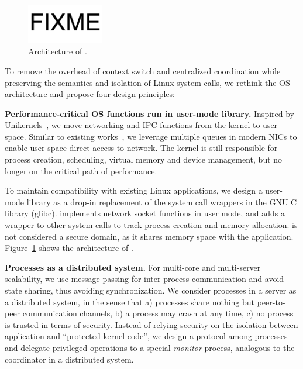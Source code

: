 \begin{figure}[t]
	\centering
	\includegraphics[width=0.3\textwidth]{images/fixme}
	\caption{Architecture of \sys{}.}
	\label{fig:architecture}
\end{figure}


To remove the overhead of context switch and centralized coordination while preserving the semantics and isolation of Linux system calls, we rethink the OS architecture and propose four design principles:

\textbf{Performance-critical OS functions run in user-mode library.}
Inspired by Unikernels~\cite{madhavapeddy2013unikernels}, we move networking and IPC functions from the kernel to user space. Similar to existing works~\cite{peter2016arrakis,jeong2014mtcp,libvma}, we leverage multiple queues in modern NICs to enable user-space direct access to network. The kernel is still responsible for process creation, scheduling, virtual memory and device management, but no longer on the critical path of performance.

To maintain compatibility with existing Linux applications, we design a user-mode library \libipc as a drop-in replacement of the system call wrappers in the GNU C library (glibc). \libipc{} implements network socket functions in user mode, and adds a wrapper to other system calls to track process creation and memory allocation. \libipc{} is not considered a secure domain, as it shares memory space with the application. Figure~\ref{fig:architecture} shows the architecture of \sys{}.

\textbf{Processes as a distributed system.}
For multi-core and multi-server scalability, we use message passing for inter-process communication and avoid state sharing, thus avoiding synchronization. We consider processes in a server as a distributed system, in the sense that a) processes share nothing but peer-to-peer communication channels, b) a process may crash at any time, c) no process is trusted in terms of security. Instead of relying security on the isolation between application and ``protected kernel code'', we design a protocol among processes and delegate privileged operations to a special \textit{monitor} process, analogous to the coordinator in a distributed system.

